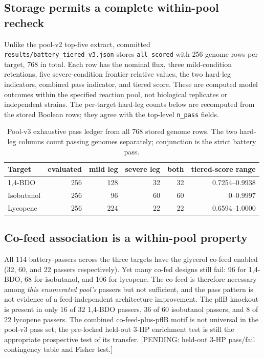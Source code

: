 \subsection{Storage permits a complete within-pool recheck}
Unlike the pool-v2 top-five extract, committed \texttt{results/battery\_tiered\_v3.json} stores \texttt{all\_scored} with 256 genome rows per target, 768 in total. Each row has the nominal flux, three mild-condition retentions, five severe-condition frontier-relative values, the two hard-leg indicators, combined pass indicator, and tiered score. These are computed model outcomes within the specified reaction pool, not biological replicates or independent strains. The per-target hard-leg counts below are recomputed from the stored Boolean rows; they agree with the top-level \texttt{n\_pass} fields.
\begin{table}[!htbp]\centering\small\caption{Pool-v3 exhaustive pass ledger from all 768 stored genome rows. The two hard-leg columns count passing genomes separately; conjunction is the strict battery pass.}
\begin{tabular}{lrrrrr}\hline Target & evaluated & mild leg & severe leg & both & tiered-score range\\\hline
1,4-BDO & 256 & 128 & 32 & 32 & 0.7254--0.9938\\
Isobutanol & 256 & 96 & 60 & 60 & 0--0.9997\\
Lycopene & 256 & 224 & 22 & 22 & 0.6594--1.0000\\\hline
\end{tabular}\end{table}
\subsection{Co-feed association is a within-pool property}
All 114 battery-passers across the three targets have the glycerol co-feed enabled (32, 60, and 22 passers respectively). Yet many co-fed designs still fail: 96 for 1,4-BDO, 68 for isobutanol, and 106 for lycopene. The co-feed is therefore necessary among \emph{this enumerated pool's} passers but not sufficient, and the pass pattern is not evidence of a feed-independent architecture improvement. The pflB knockout is present in only 16 of 32 1,4-BDO passers, 36 of 60 isobutanol passers, and 8 of 22 lycopene passers. The combined co-feed-plus-pflB motif is not universal in the pool-v3 pass set; the pre-locked held-out 3-HP enrichment test is still the appropriate prospective test of its transfer. [PENDING: held-out 3-HP pass/fail contingency table and Fisher test.]
